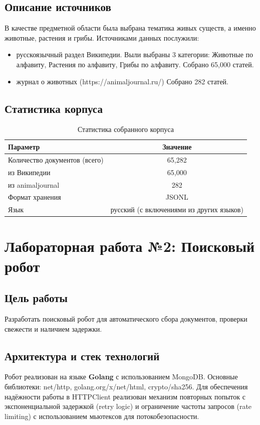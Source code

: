 \documentclass[a4paper,12pt]{article}
\begin{document}
\subsection{Описание источников}
В качестве предметной области была выбрана тематика живых существ, а именно животные, растения и грибы. Источниками данных послужили:
\begin{itemize}
    \item русскоязычный раздел Википедии. Выли выбраны 3 категории: Животные по алфавиту, Растения по алфавиту, Грибы по алфавиту. Собрано 65,000 статей.
    \item журнал о животных (https://animaljournal.ru/)  Собрано 282 статей.
\end{itemize}

\subsection{Статистика корпуса}
\begin{table}[H]
\centering
\begin{tabular}{|l|c|}
\hline
\textbf{Параметр} & \textbf{Значение} \\
\hline
Количество документов (всего) & 65,282 \\
\hline
\quad из Википедии & 65,000 \\
\hline
\quad из animaljournal & 282 \\
\hline
Формат хранения & JSONL \\
\hline
Язык & русский (с включениями из других языков) \\
\hline
\end{tabular}
\caption{Статистика собранного корпуса}
\end{table}

\section{Лабораторная работа №2: Поисковый робот}

\subsection{Цель работы}
Разработать поисковый робот для автоматического сбора документов, проверки свежести и наличием задержки.

\subsection{Архитектура и стек технологий}
Робот реализован на языке \textbf{Golang} с использованием MongoDB. Основные библиотеки: net/http, golang.org/x/net/html, crypto/sha256.
Для обеспечения надёжности работы в HTTPClient реализован механизм повторных попыток с экспоненциальной задержкой (retry logic) и ограничение частоты запросов (rate limiting) с использованием мьютексов для потокобезопасности.
\end{document}
